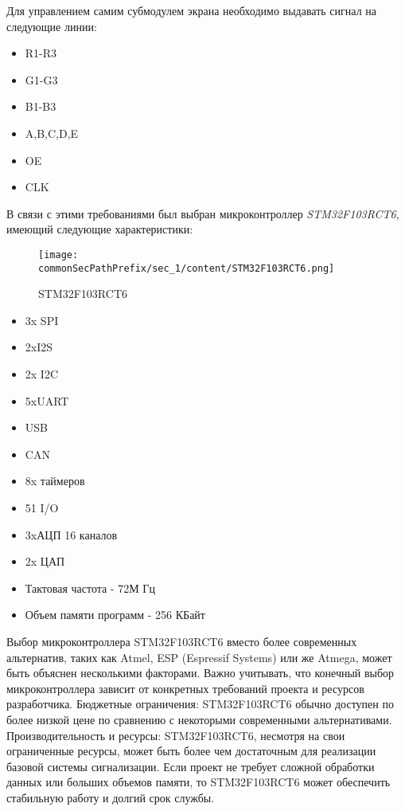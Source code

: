 Для управлением самим субмодулем экрана необходимо выдавать сигнал на следующие линии:
\begin{itemize}
    \item R1-R3
    \item G1-G3
    \item B1-B3
    \item A,B,C,D,E
    \item OE
    \item CLK
\end{itemize}

В связи с этими требованиями был выбран микроконтроллер \textit{STM32F103RCT6}, имеющий следующие характеристики:
\begin{figure}[ht]
    \centering
    \texttt{[image: \\commonSecPathPrefix/sec\_1/content/STM32F103RCT6.png]}
    \caption{STM32F103RCT6}
    \label{fig:STM32F103RCT6}
\end{figure}

\begin{itemize}
    \item 3x SPI
    \item 2xI2S
    \item 2x I2C
    \item 5xUART
    \item USB
    \item CAN
    \item 8x таймеров
    \item 51 I/O
    \item 3xАЦП 16 каналов
    \item 2x ЦАП
    \item Тактовая частота - 72М Гц
    \item Объем памяти программ -  	256 КБайт
\end{itemize}

Выбор микроконтроллера STM32F103RCT6 вместо более современных альтернатив, таких как Atmel, ESP (Espressif Systems) или же Atmega, может быть объяснен несколькими факторами. Важно учитывать, что конечный выбор микроконтроллера зависит от конкретных требований проекта и ресурсов разработчика. Бюджетные ограничения: STM32F103RCT6 обычно доступен по более низкой цене по сравнению с некоторыми современными альтернативами. Производительность и ресурсы: STM32F103RCT6, несмотря на свои ограниченные ресурсы, может быть более чем достаточным для реализации базовой системы сигнализации. Если проект не требует сложной обработки данных или больших объемов памяти, то STM32F103RCT6 может обеспечить стабильную работу и долгий срок службы. 